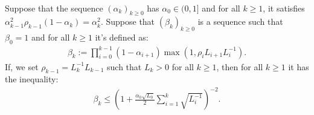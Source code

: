 \documentclass[12pt]{report}
\begin{document}
        \begin{lemma}\;\label{lemma:gmapg-seq-bnd}\\
            Suppose that the sequence $(\alpha_k)_{k \ge 0}$ has $\alpha_0 \in (0, 1]$ and for all $k \ge 1$, it satisfies $\alpha_{k - 1}^2\rho_{k - 1}(1 - \alpha_k) = \alpha_k^2$. 
            Suppose that $(\beta_k)_{k \ge 0}$ is a sequence such that $\beta_0 = 1$ and for all $k \ge 1$ it's defined as: 
            \begin{align*}
                \beta_k := \prod_{i = 0}^{k - 1}(1 - \alpha_{i + 1}) \max\left(1, \rho_i L_{i + 1}L_i^{-1}\right). 
            \end{align*}
            If, we set $\rho_{k - 1} = L_{k}^{-1}L_{k - 1}$ such that $L_k >0$ for all $k \ge 1$, then for all $k \ge 1$ it has the inequality: 
            \begin{align*}
                \beta_k \le \left(
                    1 + \frac{\alpha_0\sqrt{L_0}}{2}\sum_{i = 1}^{k} \sqrt{L_i^{-1}}
                \right)^{-2}. 
            \end{align*}
        \end{lemma}
\end{document}
